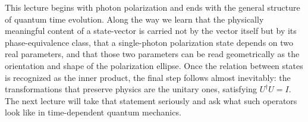 This lecture begins with photon polarization and ends with the general structure of quantum time evolution. Along the way we learn that the physically meaningful content of a state-vector is carried not by the vector itself but by its phase-equivalence class, that a single-photon polarization state depends on two real parameters, and that those two parameters can be read geometrically as the orientation and shape of the polarization ellipse. Once the relation between states is recognized as the inner product, the final step follows almost inevitably: the transformations that preserve physics are the unitary ones, satisfying $U^\dagger U=I$. The next lecture will take that statement seriously and ask what such operators look like in time-dependent quantum mechanics.